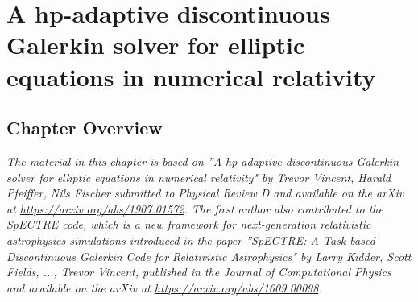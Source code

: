 \chapter{A hp-adaptive discontinuous Galerkin solver for elliptic equations in numerical relativity}

\section{Chapter Overview}

\textit{The material in this chapter is based on ”A hp-adaptive discontinuous Galerkin solver for elliptic equations in numerical relativity" by Trevor Vincent, Harald Pfeiffer, Nils Fischer submitted to Physical Review D and available on the arXiv at \url{https://arxiv.org/abs/1907.01572}. The first author also contributed to the SpECTRE code, which is a new framework for next-generation relativistic astrophysics simulations introduced in the paper ”SpECTRE: A Task-based Discontinuous Galerkin Code for Relativistic Astrophysics" by Larry Kidder, Scott Fields, ..., Trevor Vincent, published in the Journal of Computational Physics and available on the arXiv at \url{https://arxiv.org/abs/1609.00098}.}

